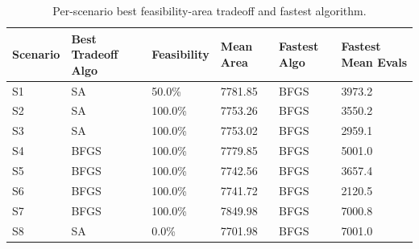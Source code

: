 \begin{table}[H]
\centering
\small
\setlength{\tabcolsep}{6pt}
\begin{tabular}{llllll}
\toprule
Scenario & Best Tradeoff Algo & Feasibility & Mean Area & Fastest Algo & Fastest Mean Evals \\
\midrule
S1 & SA & 50.0\% & 7781.85 & BFGS & 3973.2 \\
S2 & SA & 100.0\% & 7753.26 & BFGS & 3550.2 \\
S3 & SA & 100.0\% & 7753.02 & BFGS & 2959.1 \\
S4 & BFGS & 100.0\% & 7779.85 & BFGS & 5001.0 \\
S5 & BFGS & 100.0\% & 7742.56 & BFGS & 3657.4 \\
S6 & BFGS & 100.0\% & 7741.72 & BFGS & 2120.5 \\
S7 & BFGS & 100.0\% & 7849.98 & BFGS & 7000.8 \\
S8 & SA & 0.0\% & 7701.98 & BFGS & 7001.0 \\
\bottomrule
\end{tabular}
\caption{Per-scenario best feasibility-area tradeoff and fastest algorithm.}
\label{tab:key-findings}
\end{table}
